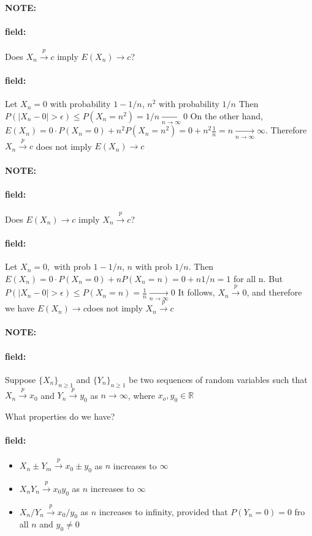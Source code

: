 \documentclass[12pt]{article}
\newenvironment{note}{\paragraph{NOTE:}}{}
\newenvironment{field}{\paragraph{field:}}{}
\begin{document}
\begin{note}
  \begin{field}
    Does $X_n \overset{p}{\to} c$ imply $E(X_n) \to c $?
  \end{field}
  \begin{field}
    Let $X_n = 0$ with probability $1 - 1/n$, $n^2 $ with probability $1/n$
    Then $P(|X_n - 0| > \epsilon) \leq P(X_n = n^2) = 1/n \underset{n \to \infty}{\to} 0$
    On the other hand,
    $E(X_n) = 0 \cdot P(X_n =0) + n^2P(X_n = n^2) = 0 + n^2 \frac{1}{n} = n \underset{n \to \infty}{\to} \infty$.
    Therefore $X_n \overset{p}{\to} c$ does not imply $E(X_n) \to c $
  \end{field}
\end{note}

\begin{note}
  \begin{field}
    Does $E(X_n) \to c $ imply $X_n \overset{p}{\to}c$?
  \end{field}
  \begin{field}
    Let $X_n = 0, $ with prob $1 - 1/n$, $n$ with prob $1/n$.
    Then $E(X_n) = 0 \cdot P(X_n = 0) + n P(X_n = n) = 0  + n 1/n = 1$ for all n.
    But $P(|X_n - 0| > \epsilon) \leq P(X_n = n) = \frac{1}{n } \underset{n \to \infty}{\to} 0$
    It follows, $X_n \overset{p}{\to} 0 $, and therefore we have $E(X_n) \to c $does not imply $X_n \overset{p}{\to}c$
  \end{field}
\end{note}

\begin{note}
  \begin{field}
     Suppose $\{X_n\}_{n \geq 1}$ and $\{Y_n\}_{n \geq 1}$ be two sequences of random variables such that $X_n \overset{p}{\to} x_0$ and $Y_n \overset{p}{\to} y_0$ as $n \to \infty$, where $x_o, y_0 \in \mathbb{R}$

     What properties do we have?
  \end{field}
  \begin{field}
    \begin{itemize}
      \item $X_n \pm Y_m \overset{p}{\to} x_0 \pm y_0$ as $n$ increases to $\infty$
      \item $X_nY_n \overset{p}{\to} x_0y_0$ as $n$ increases to $\infty$
      \item $X_n/Y_n \overset{p}{\to} x_0/y_0$ as $n$ increases to infinity, provided that $P(Y_n = 0) = 0 $ fro all $n$ and $y_0 \neq 0$
    \end{itemize}
  \end{field}
\end{note}
\end{document}
